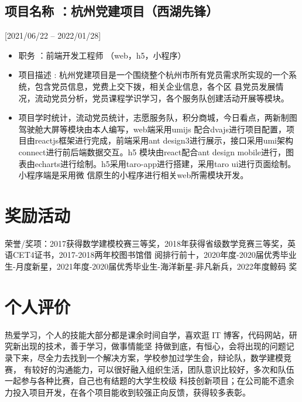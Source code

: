 \documentclass{mycv}
\begin{document}
\subsection{项目名称 ：杭州党建项目（西湖先锋）}[2021/06/22 – 2022/01/28]

\begin{itemize}
  \item 职务 ：前端开发工程师 （web，h5，小程序）
  \item 项目描述 : 杭州党建项目是一个围绕整个杭州市所有党员需求所实现的一个系统，包含党员信息，党费上交下拨，相关企业信息，各个区
        县党员发展情况，流动党员分析，党员课程学识学习，各个服务队创建活动开展等模块。
  \item  项目学时统计，流动党员统计，志愿服务队，积分商城，今日看点，两新制图驾驶舱大屏等模块由本人编写，web端采用umijs
        配合dvajs进行项目配置，项目由reactjs框架进行完成，前端采用ant design3进行展示，接口采用umi架构connect进行前后端数据交互。h5
        模块由react配合ant design mobile进行，图表由echarts进行绘制。h5采用taro-app进行搭建，采用taro ui进行页面绘制。小程序端是采用微
        信原生的小程序进行相关web所需模块开发。
\end{itemize}

\section{奖励活动}

荣誉/奖项：2017获得数学建模校赛三等奖，2018年获得省级数学竞赛三等奖，英语CET4证书，2017-2018两年校图书馆借
阅排行前十，2020年度-2020届优秀毕业生-月度新星，2021年度-2020届优秀毕业生-海洋新星-非凡新兵，2022年度鲸码
奖

\section{个人评价}

热爱学习，个人的技能大部分都是课余时间自学，喜欢逛IT 博客，代码网站，研究新出现的技术，善于学习，做事情能坚
持做到底，有恒心，会将出现的问题记录下来，尽全力去找到一个解决方案，学校参加过学生会，辩论队，数学建模竞赛，
有较好的沟通能力，可以很好融入组织生活，团队意识比较好，多次和队伍一起参与各种比赛，自己也有结题的大学生校级
科技创新项目；在公司能不遗余力投入项目开发，在各个项目能收到较强正向反馈，获得较多表彰。

\end{document}
